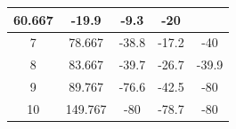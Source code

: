 \documentclass[UTF8,10pt,a4paper,fontset=fandol]{ctexart}
\newcommand{\fieldvalue}[1]{#1}
\begin{document}
\begin{center}
\begin{tabular}{|c|c|c|c|c|}
\fieldvalue{60.667} &
\fieldvalue{-19.9} &
\fieldvalue{-9.3} &
\fieldvalue{-20}\\
\hline
\fieldvalue{7} &
\fieldvalue{78.667} &
\fieldvalue{-38.8} &
\fieldvalue{-17.2} &
\fieldvalue{-40}\\
\hline
\fieldvalue{8} &
\fieldvalue{83.667} &
\fieldvalue{-39.7} &
\fieldvalue{-26.7} &
\fieldvalue{-39.9}\\
\hline
\fieldvalue{9} &
\fieldvalue{89.767} &
\fieldvalue{-76.6} &
\fieldvalue{-42.5} &
\fieldvalue{-80}\\
\hline
\fieldvalue{10} &
\fieldvalue{149.767} &
\fieldvalue{-80} &
\fieldvalue{-78.7} &
\fieldvalue{-80}\\
\hline
\end{tabular}
\end{center}

\medskip
\end{document}
